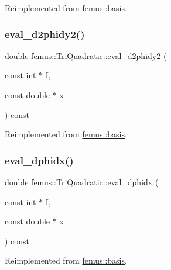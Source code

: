 Reimplemented from \mbox{\hyperlink{classfemus_1_1basis_ac9feaf9e60421143db2a3708f3c7fa48}{femus\+::basis}}.

\mbox{\label{classfemus_1_1_tri_quadratic_a37147196388fbe7fb347816f85c50e5e}} 
\subsubsection{\texorpdfstring{eval\+\_\+d2phidy2()}{eval\_d2phidy2()}}
{\footnotesize\ttfamily double femus\+::\+Tri\+Quadratic\+::eval\+\_\+d2phidy2 (\begin{DoxyParamCaption}\item[{const int $\ast$}]{I,  }\item[{const double $\ast$}]{x }\end{DoxyParamCaption}) const\hspace{0.3cm}{\ttfamily [virtual]}}



Reimplemented from \mbox{\hyperlink{classfemus_1_1basis_a0febb29fe4b32213ff8d6d428f7241cd}{femus\+::basis}}.

\mbox{\label{classfemus_1_1_tri_quadratic_a98bad1aa37518ed91350f7628b45a380}} 
\subsubsection{\texorpdfstring{eval\+\_\+dphidx()}{eval\_dphidx()}}
{\footnotesize\ttfamily double femus\+::\+Tri\+Quadratic\+::eval\+\_\+dphidx (\begin{DoxyParamCaption}\item[{const int $\ast$}]{I,  }\item[{const double $\ast$}]{x }\end{DoxyParamCaption}) const\hspace{0.3cm}{\ttfamily [virtual]}}



Reimplemented from \mbox{\hyperlink{classfemus_1_1basis_a4db7d29cf8a753ddbccc4a297dafa0bf}{femus\+::basis}}.

